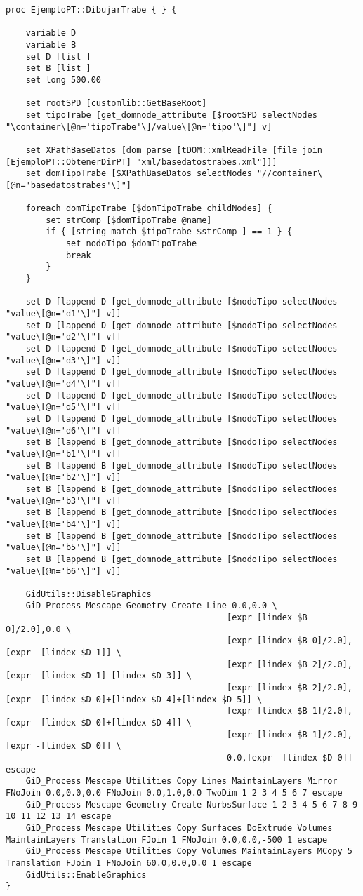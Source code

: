\documentclass[10pt, a4paper, twocolumn]{article} %
\begin{document}
\lstset{language=tcl} 
\begin{lstlisting}[caption={Definición del procedimiento \texttt{EjemploPT::DibujarTrabe}}]
proc EjemploPT::DibujarTrabe { } {
	
	variable D
	variable B
	set D [list ]
	set B [list ]
	set long 500.00
	
	set rootSPD [customlib::GetBaseRoot]
	set tipoTrabe [get_domnode_attribute [$rootSPD selectNodes "\container\[@n='tipoTrabe'\]/value\[@n='tipo'\]"] v]
	
	set XPathBaseDatos [dom parse [tDOM::xmlReadFile [file join [EjemploPT::ObtenerDirPT] "xml/basedatostrabes.xml"]]]
	set domTipoTrabe [$XPathBaseDatos selectNodes "//container\[@n='basedatostrabes'\]"]
	
	foreach domTipoTrabe [$domTipoTrabe childNodes] {
		set strComp [$domTipoTrabe @name]
		if { [string match $tipoTrabe $strComp ] == 1 } {
			set nodoTipo $domTipoTrabe
			break
		}
	}
	
	set D [lappend D [get_domnode_attribute [$nodoTipo selectNodes "value\[@n='d1'\]"] v]]
	set D [lappend D [get_domnode_attribute [$nodoTipo selectNodes "value\[@n='d2'\]"] v]]
	set D [lappend D [get_domnode_attribute [$nodoTipo selectNodes "value\[@n='d3'\]"] v]]
	set D [lappend D [get_domnode_attribute [$nodoTipo selectNodes "value\[@n='d4'\]"] v]]
	set D [lappend D [get_domnode_attribute [$nodoTipo selectNodes "value\[@n='d5'\]"] v]]
	set D [lappend D [get_domnode_attribute [$nodoTipo selectNodes "value\[@n='d6'\]"] v]]
	set B [lappend B [get_domnode_attribute [$nodoTipo selectNodes "value\[@n='b1'\]"] v]]
	set B [lappend B [get_domnode_attribute [$nodoTipo selectNodes "value\[@n='b2'\]"] v]]
	set B [lappend B [get_domnode_attribute [$nodoTipo selectNodes "value\[@n='b3'\]"] v]]
	set B [lappend B [get_domnode_attribute [$nodoTipo selectNodes "value\[@n='b4'\]"] v]]
	set B [lappend B [get_domnode_attribute [$nodoTipo selectNodes "value\[@n='b5'\]"] v]]
	set B [lappend B [get_domnode_attribute [$nodoTipo selectNodes "value\[@n='b6'\]"] v]]
	
	GidUtils::DisableGraphics
	GiD_Process Mescape Geometry Create Line 0.0,0.0 \
											[expr [lindex $B 0]/2.0],0.0 \
											[expr [lindex $B 0]/2.0],[expr -[lindex $D 1]] \
											[expr [lindex $B 2]/2.0],[expr -[lindex $D 1]-[lindex $D 3]] \
											[expr [lindex $B 2]/2.0],[expr -[lindex $D 0]+[lindex $D 4]+[lindex $D 5]] \
											[expr [lindex $B 1]/2.0],[expr -[lindex $D 0]+[lindex $D 4]] \
											[expr [lindex $B 1]/2.0],[expr -[lindex $D 0]] \
											0.0,[expr -[lindex $D 0]] escape
	GiD_Process Mescape Utilities Copy Lines MaintainLayers Mirror FNoJoin 0.0,0.0,0.0 FNoJoin 0.0,1.0,0.0 TwoDim 1 2 3 4 5 6 7 escape
	GiD_Process Mescape Geometry Create NurbsSurface 1 2 3 4 5 6 7 8 9 10 11 12 13 14 escape
	GiD_Process Mescape Utilities Copy Surfaces DoExtrude Volumes MaintainLayers Translation FJoin 1 FNoJoin 0.0,0.0,-500 1 escape
	GiD_Process Mescape Utilities Copy Volumes MaintainLayers MCopy 5 Translation FJoin 1 FNoJoin 60.0,0.0,0.0 1 escape
	GidUtils::EnableGraphics
}
\end{lstlisting}
\end{document}
